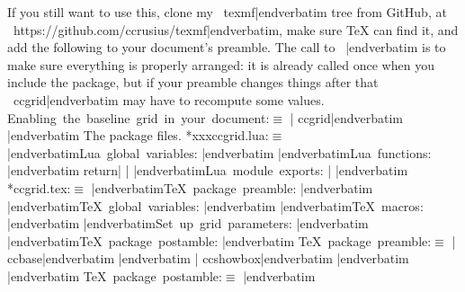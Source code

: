 If you still want to use this, clone my \hbox{\verbatim
texmf|endverbatim}{} tree from GitHub, at
\hbox{\verbatim
https://github.com/ccrusius/texmf|endverbatim}{}, make sure \TeX{} can find it,
and add the following to your document's preamble. The call
to \hbox{\verbatim
\ccgridsetup|endverbatim}{} is to make sure everything is
properly arranged: it is already called once when you include
the package, but if your preamble changes things after that
\hbox{\verbatim
ccgrid|endverbatim}{} may have to recompute some values.
\Y\B\4\setbox\cctanglebox\hbox{Enabling the baseline grid in your document}:\box\cctanglebox\X${}\equiv{}$\6
\verbatim
| ccgrid|endverbatim\6
\verbatim
%| ...| rest| of| preamble| ...|endverbatim\6
\verbatim
\ccgridsetup|endverbatim\6
\fi
{}The package files.
\B\4\setbox\cctanglebox\hbox{*{xxxccgrid.lua}}:\box\cctanglebox\X${}\equiv{}$\6
\verbatim
|endverbatim\setbox\cctanglebox\hbox{Lua global variables}:\box\cctanglebox\X\verbatim
|endverbatim\6
\verbatim
|endverbatim\setbox\cctanglebox\hbox{Lua functions}:\box\cctanglebox\X\verbatim
|endverbatim\6
\verbatim
return| {| |endverbatim\setbox\cctanglebox\hbox{Lua module exports}:\box\cctanglebox\X\verbatim
| }|endverbatim\6
\fi
{}\B\4\setbox\cctanglebox\hbox{*{ccgrid.tex}}:\box\cctanglebox\X${}\equiv{}$\6
\verbatim
|endverbatim\setbox\cctanglebox\hbox{\TeX{} package preamble}:\box\cctanglebox\X\verbatim
|endverbatim\6
\verbatim
|endverbatim\setbox\cctanglebox\hbox{\TeX{} global variables}:\box\cctanglebox\X\verbatim
|endverbatim\6
\verbatim
|endverbatim\setbox\cctanglebox\hbox{\TeX{} macros}:\box\cctanglebox\X\verbatim
|endverbatim\6
\verbatim
|endverbatim\setbox\cctanglebox\hbox{Set up grid parameters}:\box\cctanglebox\X\verbatim
|endverbatim\6
\verbatim
|endverbatim\setbox\cctanglebox\hbox{\TeX{} package postamble}:\box\cctanglebox\X\verbatim
|endverbatim\6
\fi
{}\B\4\setbox\cctanglebox\hbox{\TeX{} package preamble}:\box\cctanglebox\X${}\equiv{}$\6
\verbatim
| ccbase|endverbatim\6
\verbatim
{}|endverbatim\6
\verbatim
| ccshowbox|endverbatim\6
\verbatim
{}|endverbatim\6
\verbatim
\makeatletter|endverbatim\6
\fi
{}\B\4\setbox\cctanglebox\hbox{\TeX{} package postamble}:\box\cctanglebox\X${}\equiv{}$\6
\verbatim
\makeatother|endverbatim\6
\verbatim
\endinput|endverbatim\6
\fi
\N{0}{10}Debugging.
Things did go wrong quite often with this, as baseline gridding is not something
\TeX{} was designed to do, so I had to set up a decent enough debugging
infrastructure. You will probably not be debugging this package, but the
code needs to be here anyway.
In order to control what debugging messages are
printed, you have to set \hbox{\verbatim
ccgrid|endverbatim}{}'s log level to a suitable value, as follows:

